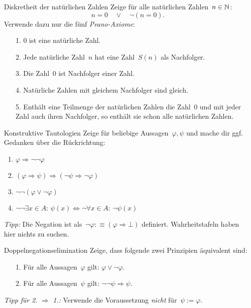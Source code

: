 \documentclass{pizzablatt}
\begin{document}

\begin{aufgabe}{Diskretheit der natürlichen Zahlen}
Zeige für alle natürlichen Zahlen~$n \in \mathbb{N}$:
\[ n = 0 \quad\vee\quad \neg(n = 0). \]
Verwende dazu nur die fünf \emph{Peano-Axiome}:
\begin{enumerate}
\item[1.] $0$ ist eine natürliche Zahl.
\item[2.] Jede natürliche Zahl~$n$ hat eine Zahl~$S(n)$ als Nachfolger.
\item[3.] Die Zahl~$0$ ist Nachfolger einer Zahl.
\item[4.] Natürliche Zahlen mit gleichem Nachfolger sind gleich.
\item[5.] Enthält eine Teilmenge der natürlichen Zahlen die Zahl~$0$ und mit jeder
Zahl auch ihren Nachfolger, so enthält sie schon alle natürlichen Zahlen.
\end{enumerate}
\end{aufgabe}

\begin{aufgabe}{Konstruktive Tautologien}
Zeige für beliebige Aussagen~$\varphi, \psi$ und mache dir ggf. Gedanken über die
Rückrichtung:
\begin{enumerate}
\item $\varphi \Longrightarrow \neg\neg\varphi$
\item $(\varphi \Rightarrow \psi) \Longrightarrow (\neg\psi \Rightarrow
\neg\varphi)$
\item $\neg\neg(\varphi \vee \neg\varphi)$
\item $\neg\neg\exists x \in A{:}\, \psi(x) \Longleftrightarrow
  \neg\forall x \in A{:}\, \neg\psi(x)$
\end{enumerate}
\emph{Tipp:} Die Negation ist als~$\neg\varphi :\equiv (\varphi \Rightarrow
\bot)$ definiert. Wahrheitstafeln haben hier nichts zu suchen.
\end{aufgabe}

\begin{aufgabe}{Doppelnegationselimination}
Zeige, dass folgende zwei Prinzipien äquivalent sind:
\begin{enumerate}
\item[1.] Für alle Aussagen~$\varphi$ gilt: $\varphi \vee \neg\varphi$.
\item[2.] Für alle Aussagen~$\psi$ gilt: $\neg\neg\psi \Rightarrow
\psi$.
\end{enumerate}
\emph{Tipp für 2. $\Rightarrow$ 1.:} Verwende die Voraussetzung \emph{nicht} für~$\psi
:= \varphi$.
\end{aufgabe}
\end{document}
